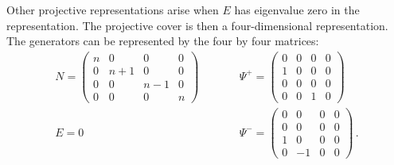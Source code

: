 \documentclass[12pt]{article}
\numberwithin{equation}{section}
\numberwithin{equation}{section}
\numberwithin{table}{section}\setlength{\multlinegap}{25pt}
\begin{document}
Other projective representations arise when $E$ has eigenvalue zero in the representation.
The projective cover is then a four-dimensional representation. The generators can
be represented by the four by four matrices:
\begin{eqnarray}
N = \left( \begin{array}{cccc}
         n & 0 & 0 & 0 \\
         0 & n+1 & 0 & 0   \\
         0 & 0 & n-1 & 0   \\
         0 & 0 & 0 & n  
       \end{array}  \right)
& \qquad & 
\Psi^+ = \left( \begin{array}{cccc}
         0 & 0 & 0 & 0 \\
         1 & 0 & 0 & 0   \\
         0 & 0 & 0 & 0   \\
         0 & 0 & 1 & 0  
       \end{array}  \right)
\nonumber \\
E=0
& \qquad &
\Psi^- = \left( \begin{array}{cccc}
         0 & 0 & 0 & 0 \\
         0 & 0 & 0 & 0   \\
         1 & 0 & 0 & 0   \\
         0 & -1 & 0 & 0  
       \end{array}  \right) \, .
\end{eqnarray}
\end{document}
